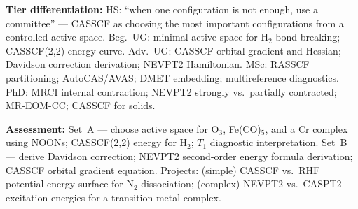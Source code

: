 \documentclass[11pt,a4paper]{article}
\begin{document}
\begin{tcolorbox}[modulebox, title={Module~II.1 / L10: Multi-Reference Methods}]
\medskip\textbf{Tier differentiation:}
HS: ``when one configuration is not enough, use a committee'' ---
CASSCF as choosing the most important configurations from a controlled active space.
Beg.\ UG: minimal active space for H$_2$ bond breaking; CASSCF(2,2) energy curve.
Adv.\ UG: CASSCF orbital gradient and Hessian; Davidson correction derivation; NEVPT2 Hamiltonian.
MSc: RASSCF partitioning; AutoCAS/AVAS; DMET embedding; multireference diagnostics.
PhD: MRCI internal contraction; NEVPT2 strongly vs.\ partially contracted; MR-EOM-CC;
CASSCF for solids.

\medskip\textbf{Assessment:}
Set~A --- choose active space for O$_3$, Fe(CO)$_5$, and a Cr complex using NOONs;
CASSCF(2,2) energy for H$_2$; $T_1$ diagnostic interpretation.
Set~B --- derive Davidson correction; NEVPT2 second-order energy formula derivation;
CASSCF orbital gradient equation.
Projects: (simple) CASSCF vs.\ RHF potential energy surface for N$_2$ dissociation;
(complex) NEVPT2 vs.\ CASPT2 excitation energies for a transition metal complex.
\end{tcolorbox}

\medskip
\end{document}
